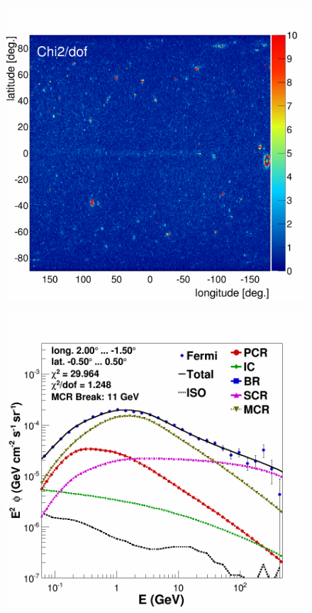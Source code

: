 
\newpage
\begin{figure}[H]
  \centering
  \begin{minipage}[h]{0.45\textwidth}
  	\centering
	\includegraphics[width=1.\linewidth]{pic/results/MCRonly_fine_chi2_distribution.png}
  	\subcaption{}
  	\label{fig:MCRonly_chi2Distribution}
  \end{minipage}
  \hfill
  \begin{minipage}[h]{0.45\textwidth}
  	\centering
	\includegraphics[width=\linewidth]{pic/results/MCRonly_CMZ.png}

\end{minipage}
\end{figure}
